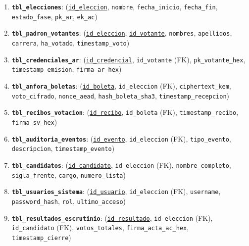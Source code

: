 \begin{enumerate}
	\item \textbf{\texttt{tbl\_elecciones}}: (\underline{\texttt{id\_eleccion}}, \texttt{nombre}, \texttt{fecha\_inicio}, \texttt{fecha\_fin}, \texttt{estado\_fase}, \texttt{pk\_ar}, \texttt{ek\_ac})
	\item \textbf{\texttt{tbl\_padron\_votantes}}: (\underline{\texttt{id\_eleccion}}, \underline{\texttt{id\_votante}}, \texttt{nombres}, \texttt{apellidos}, \texttt{carrera}, \texttt{ha\_votado}, \texttt{timestamp\_voto})
	\item \textbf{\texttt{tbl\_credenciales\_ar}}: (\underline{\texttt{id\_credencial}}, \texttt{id\_votante} (FK), \texttt{pk\_votante\_hex}, \texttt{timestamp\_emision}, \texttt{firma\_ar\_hex})
	\item \textbf{\texttt{tbl\_anfora\_boletas}}: (\underline{\texttt{id\_boleta}}, \texttt{id\_eleccion} (FK), \texttt{ciphertext\_kem}, \texttt{voto\_cifrado}, \texttt{nonce\_aead}, \texttt{hash\_boleta\_sha3}, \texttt{timestamp\_recepcion})
	\item \textbf{\texttt{tbl\_recibos\_votacion}}: (\underline{\texttt{id\_recibo}}, \texttt{id\_boleta} (FK), \texttt{timestamp\_recibo}, \texttt{firma\_sv\_hex})
	\item \textbf{\texttt{tbl\_auditoria\_eventos}}: (\underline{\texttt{id\_evento}}, \texttt{id\_eleccion} (FK), \texttt{tipo\_evento}, \texttt{descripcion}, \texttt{timestamp\_evento})
	\item \textbf{\texttt{tbl\_candidatos}}: (\underline{\texttt{id\_candidato}}, \texttt{id\_eleccion} (FK), \texttt{nombre\_completo}, \texttt{sigla\_frente}, \texttt{cargo}, \texttt{numero\_lista})
	\item \textbf{\texttt{tbl\_usuarios\_sistema}}: (\underline{\texttt{id\_usuario}}, \texttt{id\_eleccion} (FK), \texttt{username}, \texttt{password\_hash}, \texttt{rol}, \texttt{ultimo\_acceso})
	\item \textbf{\texttt{tbl\_resultados\_escrutinio}}: (\underline{\texttt{id\_resultado}}, \texttt{id\_eleccion} (FK), \texttt{id\_candidato} (FK), \texttt{votos\_totales}, \texttt{firma\_acta\_ac\_hex}, \texttt{timestamp\_cierre})
\end{enumerate}


